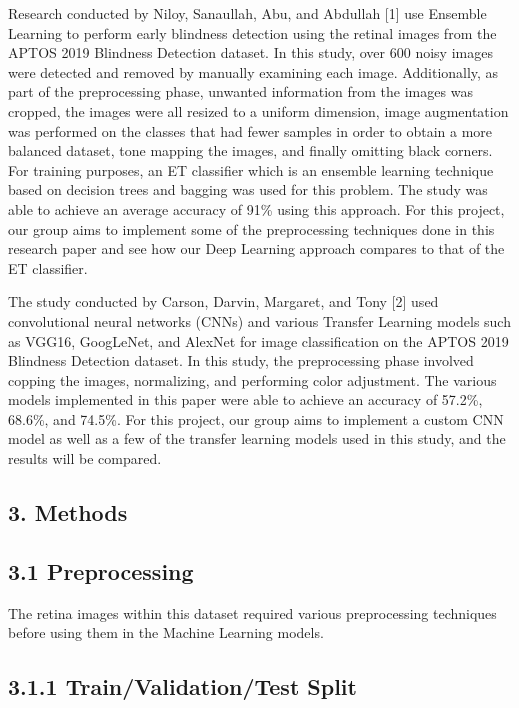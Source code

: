 \documentclass[
]{article}
\begin{document}
Research conducted by Niloy, Sanaullah, Abu, and Abdullah {[}1{]} use
Ensemble Learning to perform early blindness detection using the retinal
images from the APTOS 2019 Blindness Detection dataset. In this study,
over 600 noisy images were detected and removed by manually examining
each image. Additionally, as part of the preprocessing phase, unwanted
information from the images was cropped, the images were all resized to
a uniform dimension, image augmentation was performed on the classes
that had fewer samples in order to obtain a more balanced dataset, tone
mapping the images, and finally omitting black corners. For training
purposes, an ET classifier which is an ensemble learning technique based
on decision trees and bagging was used for this problem. The study was
able to achieve an average accuracy of 91\% using this approach. For
this project, our group aims to implement some of the preprocessing
techniques done in this research paper and see how our Deep Learning
approach compares to that of the ET classifier.

The study conducted by Carson, Darvin, Margaret, and Tony {[}2{]} used
convolutional neural networks (CNNs) and various Transfer Learning
models such as VGG16, GoogLeNet, and AlexNet for image classification on
the APTOS 2019 Blindness Detection dataset. In this study, the
preprocessing phase involved copping the images, normalizing, and
performing color adjustment. The various models implemented in this
paper were able to achieve an accuracy of 57.2\%, 68.6\%, and 74.5\%.
For this project, our group aims to implement a custom CNN model as well
as a few of the transfer learning models used in this study, and the
results will be compared.

\hypertarget{methods}{%
\subsection{\texorpdfstring{\textbf{3. Methods}}{Methods}}\label{methods}}

\hypertarget{preprocessing}{%
\subsection{\texorpdfstring{\textbf{3.1
Preprocessing}}{3.1 Preprocessing}}\label{preprocessing}}

The retina images within this dataset required various preprocessing
techniques before using them in the Machine Learning models.

\hypertarget{trainvalidationtest-split}{%
\subsection{\texorpdfstring{\textbf{3.1.1 Train/Validation/Test
Split}}{3.1.1 Train/Validation/Test Split}}\label{trainvalidationtest-split}}
\end{document}

